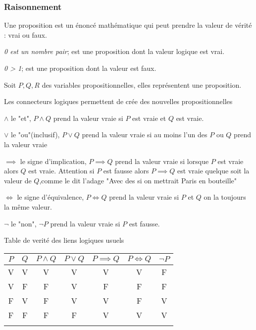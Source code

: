 \subsubsection{Raisonnement}
\label{lang}
\begin{defini}[Proposition]
    Une proposition est un énoncé mathématique qui peut prendre la valeur de vérité : vrai ou faux.
\end{defini}
\begin{ex}
    \textit{0 est un nombre pair}; est une proposition dont la valeur logique est vrai.

    \textit{0 > 1}; est une proposition dont la valeur est faux.
\end{ex}
Soit $P,Q,R$ des variables propositionnelles, elles représentent une proposition.
\begin{defini}
    Les connecteurs logiques permettent de crée des nouvelles propositionnelles

    $\land$ le "et", $P\land Q$ prend la valeur vraie si $P$ est vraie et $Q$ est vraie.

    $\vee$ le "ou"(inclusif), $P\vee Q$ prend la valeur vraie si au moins l'un des $P$ ou $Q$ prend la valeur vraie

    $\implies$ le signe d'implication, $P\implies Q$ prend la valeur vraie si lorsque $P$ est vraie alors $Q$ est vraie. Attention si $P$ est fausse alors $P\implies Q$ est vraie quelque soit la valeur de $Q$,comme le dit l'adage "Avec des si on mettrait Paris en bouteille"

    $\iff$ le signe d'équivalence, $P\iff Q$ prend la valeur vraie si $P$ et $Q$ on la toujours la même valeur.

    $\lnot$ le "non", $\lnot P$ prend la valeur vraie si $P$ est fausse.
    
\end{defini}
Table de verité des liens logiques usuels 
\begin{center}
    \begin{tabular}{!{\color{black}\vrule}c!{\color{black}\vrule}c!{\color{black}\vrule}c|c|c|c|c!{\color{black}\vrule}} 
    \hline
    $P$ & $Q$ & $P \land Q $ & $P \vee Q$ & $P \implies Q$ & $P \iff Q$ & $\lnot P$  \\ 
    \hline
    V   & V   & V            & V          & V              & V          & F          \\ 
    \hline
    V   & F   & F            & V          & F              & F          & F          \\ 
    \hline
    F   & V   & F            & V          & V              & F          & V          \\ 
    \hline
    F   & F   & F            & F          & V              & V          & V          \\
    \hline
    \end{tabular}
\end{center}
